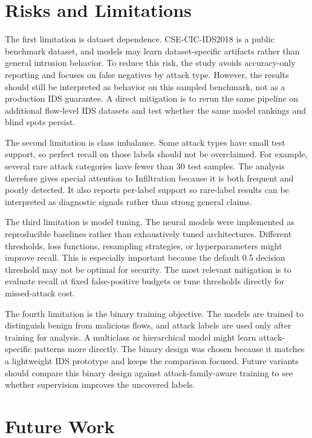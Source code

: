 \documentclass[sigconf,nonacm]{acmart}
\begin{document}
\section{Risks and Limitations}

The first limitation is dataset dependence.
CSE-CIC-IDS2018 is a public benchmark dataset, and models may learn dataset-specific artifacts rather than general intrusion behavior.
To reduce this risk, the study avoids accuracy-only reporting and focuses on false negatives by attack type.
However, the results should still be interpreted as behavior on this sampled benchmark, not as a production IDS guarantee.
A direct mitigation is to rerun the same pipeline on additional flow-level IDS datasets and test whether the same model rankings and blind spots persist.

The second limitation is class imbalance.
Some attack types have small test support, so perfect recall on those labels should not be overclaimed.
For example, several rare attack categories have fewer than 30 test samples.
The analysis therefore gives special attention to Infiltration because it is both frequent and poorly detected.
It also reports per-label support so rare-label results can be interpreted as diagnostic signals rather than strong general claims.

The third limitation is model tuning.
The neural models were implemented as reproducible baselines rather than exhaustively tuned architectures.
Different thresholds, loss functions, resampling strategies, or hyperparameters might improve recall.
This is especially important because the default 0.5 decision threshold may not be optimal for security.
The most relevant mitigation is to evaluate recall at fixed false-positive budgets or tune thresholds directly for missed-attack cost.

The fourth limitation is the binary training objective.
The models are trained to distinguish benign from malicious flows, and attack labels are used only after training for analysis.
A multiclass or hierarchical model might learn attack-specific patterns more directly.
The binary design was chosen because it matches a lightweight IDS prototype and keeps the comparison focused.
Future variants should compare this binary design against attack-family-aware training to see whether supervision improves the uncovered labels.

\section{Future Work}
\end{document}

